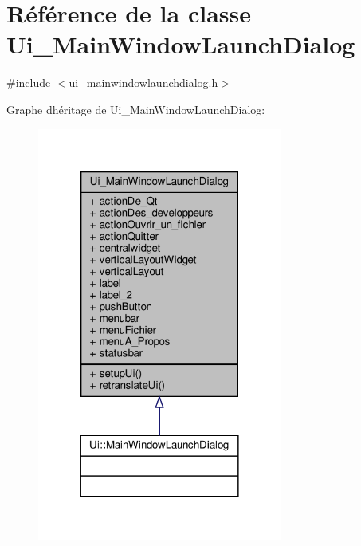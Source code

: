 \hypertarget{classUi__MainWindowLaunchDialog}{}\section{Référence de la classe Ui\+\_\+\+Main\+Window\+Launch\+Dialog}
\label{classUi__MainWindowLaunchDialog}


{\ttfamily \#include $<$ui\+\_\+mainwindowlaunchdialog.\+h$>$}



Graphe d\textquotesingle{}héritage de Ui\+\_\+\+Main\+Window\+Launch\+Dialog\+:\nopagebreak
\begin{figure}[H]
\begin{center}
\leavevmode
\includegraphics[width=228pt]{classUi__MainWindowLaunchDialog__inherit__graph}
\end{center}
\end{figure}


